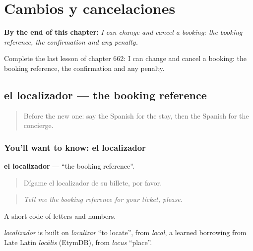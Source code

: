 
\chapter{Cambios y cancelaciones}
\label{ch:es-cambios-y-cancelaciones}

\begin{chapteropening}
\textbf{By the end of this chapter:} \emph{I can change and cancel a booking: the booking reference, the confirmation and any penalty.}

Complete the last lesson of chapter 662: I can change and cancel a booking: the booking reference, the confirmation and any penalty.
\end{chapteropening}

\section[el localizador]{el localizador — the booking reference}

\label{lesson:ES-C662-localizador}



\begin{quote}
Before the new one: say the Spanish for the stay, then the Spanish for the concierge.
\end{quote}

\subsection*{You'll want to know: el localizador}
\textbf{el localizador} — \textquotedblleft{}the booking reference\textquotedblright{}.

\begin{quote}
Dígame el localizador de su billete, por favor.
\end{quote}

\begin{quote}
\emph{Tell me the booking reference for your ticket, please.}
\end{quote}

A short code of letters and numbers.

\begin{cousinweb}
\emph{localizador} is built on \emph{localizar} \textquotedblleft{}to locate\textquotedblright{}, from \emph{local}, a learned borrowing from Late Latin \emph{locālis} (EtymDB), from \emph{locus} \textquotedblleft{}place\textquotedblright{}.
\end{cousinweb}

